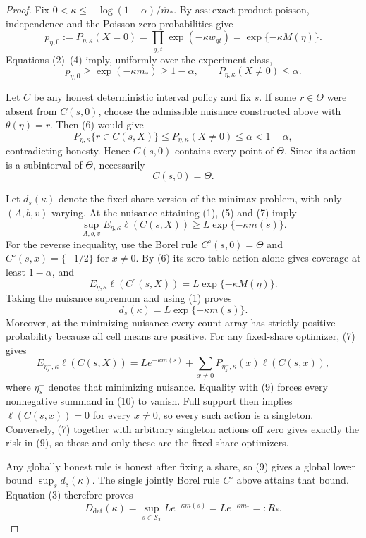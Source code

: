 \documentclass{article}
\begin{document}
\begin{proof}
Fix \(0<\kappa\le-\log(1-\alpha)/\overline m_*\).  By \(\mathrm{ass{:}exact\text{-}product\text{-}poisson}\), independence and the Poisson zero probabilities give
\[
 p_{\eta,0}:=P_{\eta,\kappa}(X=0)
 =\prod_{g,t}\exp(-\kappa w_{gt})
 =\exp\{-\kappa M(\eta)\}.
\tag{5}
\]
Equations (2)--(4) imply, uniformly over the experiment class,
\[
 p_{\eta,0}\ge \exp(-\kappa\overline m_*)\ge1-\alpha,
 \qquad P_{\eta,\kappa}(X\ne0)\le\alpha.
\tag{6}
\]

Let \(C\) be any honest deterministic interval policy and fix \(s\).  If some \(r\in\Theta\) were absent from \(C(s,0)\), choose the admissible nuisance constructed above with \(\theta(\eta)=r\).  Then (6) would give
\[
 P_{\eta,\kappa}\{r\in C(s,X)\}
 \le P_{\eta,\kappa}(X\ne0)
 \le\alpha<1-\alpha,
\]
contradicting honesty.  Hence \(C(s,0)\) contains every point of \(\Theta\).  Since its action is a subinterval of \(\Theta\), necessarily
\[
 C(s,0)=\Theta.
\tag{7}
\]

Let \(d_s(\kappa)\) denote the fixed-share version of the minimax problem, with only \((A,b,v)\) varying.  At the nuisance attaining (1), (5) and (7) imply
\[
 \sup_{A,b,v}E_{\eta,\kappa}\ell(C(s,X))
 \ge L\exp\{-\kappa m(s)\}.
\tag{8}
\]
For the reverse inequality, use the Borel rule \(C^\circ(s,0)=\Theta\) and \(C^\circ(s,x)=\{-1/2\}\) for \(x\ne0\).  By (6) its zero-table action alone gives coverage at least \(1-\alpha\), and
\[
 E_{\eta,\kappa}\ell(C^\circ(s,X))
 =L\exp\{-\kappa M(\eta)\}.
\]
Taking the nuisance supremum and using (1) proves
\[
 d_s(\kappa)=L\exp\{-\kappa m(s)\}.
\tag{9}
\]
Moreover, at the minimizing nuisance every count array has strictly positive probability because all cell means are positive.  For any fixed-share optimizer, (7) gives
\[
 E_{\eta_s^-,\kappa}\ell(C(s,X))
 =L e^{-\kappa m(s)}+
   \sum_{x\ne0}P_{\eta_s^-,\kappa}(x)\ell(C(s,x)),
\tag{10}
\]
where \(\eta_s^-\) denotes that minimizing nuisance.  Equality with (9) forces every nonnegative summand in (10) to vanish.  Full support then implies \(\ell(C(s,x))=0\) for every \(x\ne0\), so every such action is a singleton.  Conversely, (7) together with arbitrary singleton actions off zero gives exactly the risk in (9), so these and only these are the fixed-share optimizers.

Any globally honest rule is honest after fixing a share, so (9) gives a global lower bound \(\sup_s d_s(\kappa)\).  The single jointly Borel rule \(C^\circ\) above attains that bound.  Equation (3) therefore proves
\[
 D_{\mathrm{det}}(\kappa)
 =\sup_{s\in\mathcal S_T}L e^{-\kappa m(s)}
 =L e^{-\kappa m_*}=:R_*.
\tag{11}
\]


\end{proof}
\end{document}
